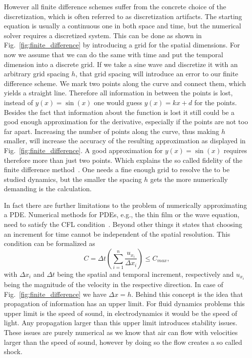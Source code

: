 However all finite difference schemes suffer from the concrete choice of the discretization, which is often referred to as discretization artifacts.
The starting equation is usually a continuous one in both space and time, but the numerical solver requires a discretized system. 
This can be done as shown in Fig.~\ref{fig:finite_difference} by introducing a grid for the spatial dimensions. 
For now we assume that we can do the same with time and put the temporal dimension into a discrete grid. 
If we take a sine wave and discretize it with an arbitrary grid spacing $h$, that grid spacing will introduce an error to our finite difference scheme. 
We mark two points along the curve and connect them, which yields a straight line. 
Therefore all information in between the points is lost, instead of $y(x) = \sin(x)$ one would guess $y(x) = kx + d$ for the points.
Besides the fact that information about the function is lost it still could be a good enough approximation for the derivative, especially if the points are not too far apart.
Increasing the number of points along the curve, thus making $h$ smaller, will increase the accuracy of the resulting approximation as displayed in Fig.~\ref{fig:finite_difference}.
A good approximation for $y(x) = \sin(x)$ requires therefore more than just two points.
Which explains the so called fidelity of the finite difference method~\cite{guruswamyReviewNumericalFluids2002}.
One needs a fine enough grid to resolve the to be studied dynamics, but the smaller the spacing $h$ gets the more numerically demanding is the calculation.

In fact there are further limitations to the problem of numerically approximating a PDE.
Numerical methods for PDEs, e.g., the thin film or the wave equation, need to satisfy the CFL condition~\cite{courantUeberPartiellenDifferenzengleichungen1928}.  
Beyond other things it states that choosing an increment for time cannot be independent of the spatial resolution.
This condition can be formalized as
\begin{equation}\label{eq:CFL}
    C = \Delta t \left(\sum_{i=1}^n \frac{u_{x_i}}{\Delta x_i}\right) \leq C_{max},
\end{equation}
with $\Delta x_i$ and $\Delta t$ being the spatial and temporal increment, respectively and $u_{x_i}$ being the magnitude of the velocity in the respective direction.
In case of Fig.~\ref{fig:finite_difference} we have $\Delta x = h$. 
Behind this concept is the idea that propagation of information has an upper limit.
For fluid dynamics problems this upper limit is the speed of sound, in electrodynamics it would be the speed of light.
Any propagation larger than this upper limit introduces stability issues.
These issues are purely numerical as we know that air can flow with velocities larger than the speed of sound, however by doing so the flow creates a so called shock.

